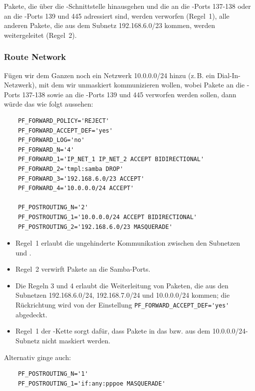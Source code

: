 Pakete, die über die -Schnittstelle hinausgehen und die an die
-Ports 137-138 oder an die -Ports 139 und 445
adressiert sind, werden verworfen (Regel~1), alle anderen Pakete, die aus dem
Subnetz 192.168.6.0/23 kommen, werden weitergeleitet (Regel~2).

\subsubsection{Route Network}

Fügen wir dem Ganzen noch ein Netzwerk 10.0.0.0/24 hinzu (z.\,B. ein
Dial-In-Netzwerk), mit dem wir unmaskiert kommunizieren wollen, wobei
Pakete an die -Ports 137-138 sowie an die -Ports
139 und 445 verworfen werden sollen, dann würde das wie folgt aussehen:

\begin{example}
\begin{verbatim}
    PF_FORWARD_POLICY='REJECT'
    PF_FORWARD_ACCEPT_DEF='yes'
    PF_FORWARD_LOG='no'
    PF_FORWARD_N='4'
    PF_FORWARD_1='IP_NET_1 IP_NET_2 ACCEPT BIDIRECTIONAL'
    PF_FORWARD_2='tmpl:samba DROP'
    PF_FORWARD_3='192.168.6.0/23 ACCEPT'
    PF_FORWARD_4='10.0.0.0/24 ACCEPT'

    PF_POSTROUTING_N='2'
    PF_POSTROUTING_1='10.0.0.0/24 ACCEPT BIDIRECTIONAL'
    PF_POSTROUTING_2='192.168.6.0/23 MASQUERADE'
\end{verbatim}
\end{example}

\begin{itemize}
\item Regel~1 erlaubt die ungehinderte Kommunikation zwischen den Subnetzen
   und .
\item Regel~2 verwirft Pakete an die Samba-Ports.
\item Die Regeln 3 und 4 erlaubt die Weiterleitung von Paketen, die aus den
  Subnetzen 192.168.6.0/24, 192.168.7.0/24 und 10.0.0.0/24 kommen; die
  Rückrichtung wird von der Einstellung \verb+PF_FORWARD_ACCEPT_DEF='yes'+
  abgedeckt.
\item Regel~1 der -Kette sorgt dafür, dass Pakete in
das bzw. aus dem 10.0.0.0/24-Subnetz nicht maskiert werden.
\end{itemize}

Alternativ ginge auch:

\begin{example}
\begin{verbatim}
    PF_POSTROUTING_N='1'
    PF_POSTROUTING_1='if:any:pppoe MASQUERADE'
\end{verbatim}
\end{example}

